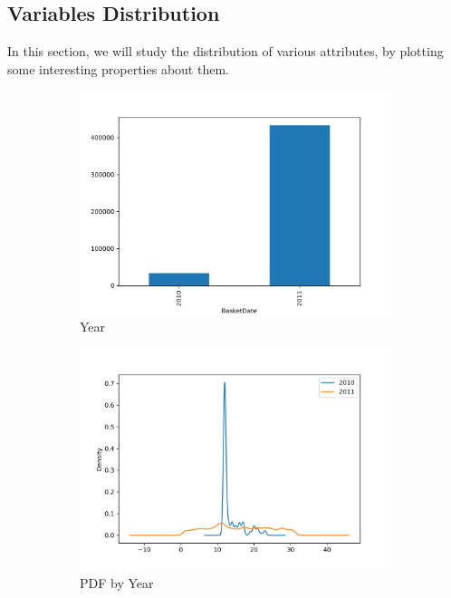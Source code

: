 \subsection{Variables Distribution}
In this section, we will study the distribution of various attributes, by plotting some interesting properties about them.

\begin{figure}[!h]
\begin{subfigure}{.5\textwidth}
\centering
\includegraphics[width=.9\textwidth]{img/year_count.png}
\caption{Year}
\label{fig:year_count}
\end{subfigure}
\begin{subfigure}{.5\textwidth}
\centering
\includegraphics[width=.9\textwidth]{img/kde_year.png}
\caption{PDF by Year}
\label{fig:kde_year}
\end{subfigure}
\begin{subfigure}{.5\textwidth}
\centering

\end{subfigure}
\end{figure}
